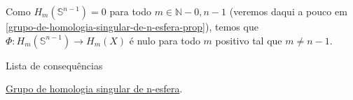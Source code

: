 Como $H_m(\mathbb{S}^{n-1})=0$ para todo $m\in\mathbb{N}-{0,n-1}$ (veremos daqui a pouco em \ref{grupo-de-homologia-singular-de-n-esfera-prop}), temos que $\Phi:H_m(\mathbb{S}^{n-1})\rightarrow H_m(X)$ é nulo para todo $m$ positivo tal que $m\ne n-1$.

\begin{titlemize}{Lista de consequências}
    \item \hyperref[grupo-de-homologia-singular-de-n-esfera-prop]{Grupo de homologia singular de n-esfera}.\\
\end{titlemize}
